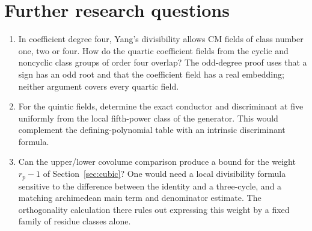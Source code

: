 \documentclass[10pt,letterpaper]{article}
\begin{document}









\section{Further research questions}
\begin{enumerate}[leftmargin=*]
\item In coefficient degree four, Yang's divisibility allows CM fields of
class number one, two or four. How do the quartic coefficient fields from
the cyclic and noncyclic class groups of order four overlap? The odd-degree
proof uses that a sign has an odd root and that the coefficient field has
a real embedding; neither argument covers every quartic field.
\item For the quintic fields, determine the exact conductor and discriminant
at five uniformly from the local fifth-power class of the generator. This
would complement the defining-polynomial table with an intrinsic discriminant formula.
\item Can the upper/lower covolume comparison produce a bound for the
weight $r_p-1$ of Section~\ref{sec:cubic}? One would need a local
divisibility formula sensitive to the difference between the identity and a
three-cycle, and a matching archimedean main term and denominator estimate.
The orthogonality calculation there rules out expressing this weight by a
fixed family of residue classes alone.
\end{enumerate}
\end{document}

